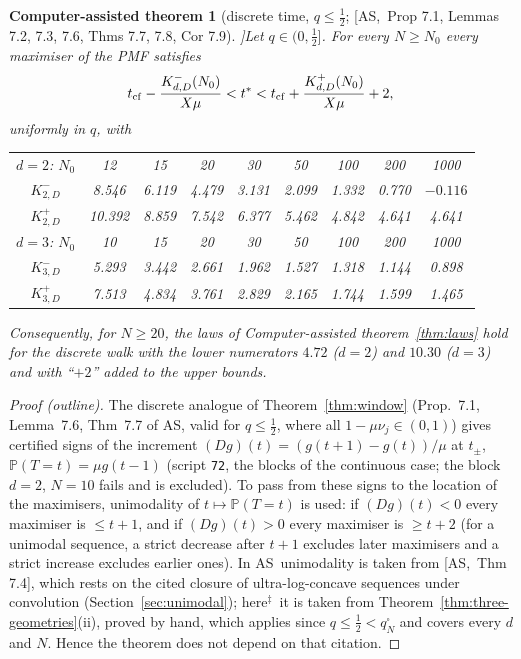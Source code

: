 \documentclass[10pt,a4paper]{article}
\theoremstyle{plain}
\newtheorem{catheorem}[theorem]{Computer-assisted theorem}
\theoremstyle{definition}
\newcommand{\SYN}{\ensuremath{^{\ddagger}}}      %
\newcommand{\src}[2]{[\textsf{#1},~#2]}           %
\newcommand{\ASY}{\textsf{AS}}
\renewcommand{\P}{\mathbb{P}}
\newcommand{\qbox}{q^{\square}_N}
\begin{document}
\begin{catheorem}[discrete time, $q\le\frac12$; \src{\ASY}{Prop 7.1, Lemmas 7.2, 7.3, 7.6, Thms 7.7, 7.8, Cor 7.9}]\label{thm:cf-disc-half}
Let $q\in(0,\frac12]$. For every $N\ge N_0$ every maximiser of the PMF satisfies
\[
t_{\rm cf}-\frac{K^-_{d,D}(N_0)}{X\mu}<t^*<t_{\rm cf}+\frac{K^+_{d,D}(N_0)}{X\mu}+2,
\]
uniformly in $q$, with
\begin{center}\small
\begin{tabular}{c|cccccccc}
$d=2$: $N_0$ & 12 & 15 & 20 & 30 & 50 & 100 & 200 & 1000\\
$K^-_{2,D}$ & 8.546 & 6.119 & 4.479 & 3.131 & 2.099 & 1.332 & 0.770 & $-0.116$\\
$K^+_{2,D}$ & 10.392 & 8.859 & 7.542 & 6.377 & 5.462 & 4.842 & 4.641 & 4.641\\
\hline
$d=3$: $N_0$ & 10 & 15 & 20 & 30 & 50 & 100 & 200 & 1000\\
$K^-_{3,D}$ & 5.293 & 3.442 & 2.661 & 1.962 & 1.527 & 1.318 & 1.144 & 0.898\\
$K^+_{3,D}$ & 7.513 & 4.834 & 3.761 & 2.829 & 2.165 & 1.744 & 1.599 & 1.465
\end{tabular}
\end{center}
Consequently, for $N\ge20$, the laws of Computer-assisted theorem~\ref{thm:laws} hold for the discrete walk with the lower numerators $4.72$ ($d=2$) and $10.30$ ($d=3$) and with ``$+2$'' added to the upper bounds.
\end{catheorem}
\begin{proof}[Proof (outline)]
The discrete analogue of Theorem~\ref{thm:window} (Prop.~7.1, Lemma~7.6, Thm~7.7 of \ASY, valid for $q\le\frac12$, where all $1-\mu\nu_j\in(0,1)$) gives certified signs of the increment $(Dg)(t)=(g(t+1)-g(t))/\mu$ at $t_\pm$, $\P(T=t)=\mu g(t-1)$ (script \texttt{72}, the blocks of the continuous case; the block $d=2$, $N=10$ fails and is excluded). To pass from these signs to the location of the maximisers, unimodality of $t\mapsto\P(T=t)$ is used: if $(Dg)(t)<0$ every maximiser is $\le t+1$, and if $(Dg)(t)>0$ every maximiser is $\ge t+2$ (for a unimodal sequence, a strict decrease after $t+1$ excludes later maximisers and a strict increase excludes earlier ones). In \ASY\ unimodality is taken from \src{\ASY}{Thm 7.4}, which rests on the cited closure of ultra-log-concave sequences under convolution (Section~\ref{sec:unimodal}); here\SYN\ it is taken from Theorem~\ref{thm:three-geometries}(ii), proved by hand, which applies since $q\le\frac12<\qbox$ and covers every $d$ and $N$. Hence the theorem does not depend on that citation.
\end{proof}
\end{document}
